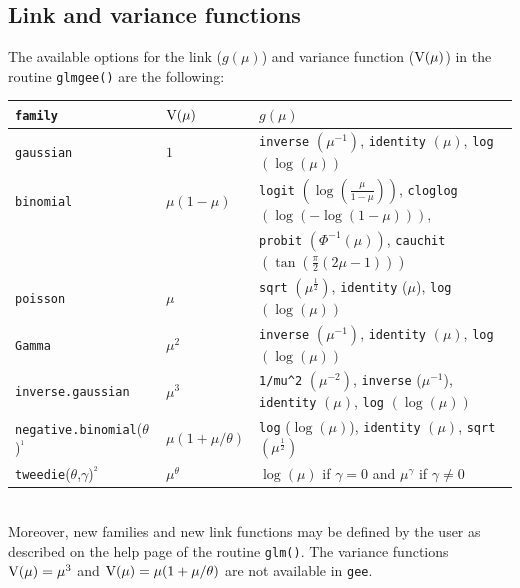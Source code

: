 \subsection{Link and variance functions}
The available options for the link ($g(\mu)$) and variance function (${\rm V}(\mu)$) in the routine {\tt glmgee()} are the following:
\begin{center}\label{vfs}
\begin{tabular}{l l l} 
 \hline
 {\tt family} & ${\rm V}(\mu)$ & $g(\mu)$\\ [1.5ex] 
 \hline
 {\tt gaussian} & $1$ & {\tt inverse} $\left(\mu^{-1}\right)$, {\tt identity} $(\mu)$, {\tt log} $(\log(\mu))$\\ 
 {\tt binomial} & $\mu(1-\mu)$ & {\tt logit} $\left(\!\log\!\left(\!\frac{\mu}{1-\mu}\!\right)\!\right)$, {\tt cloglog} $\left(\log(-\log(1-\mu))\right)$,\\
 &  & {\tt probit} $\left(\Phi^{-1}(\mu)\right)$, {\tt cauchit} $\left(\tan\!\left(\frac{\pi}{2}(2\mu-1)\right)\right)$\\
 {\tt poisson} & $\mu$ & {\tt sqrt} $\left(\!\mu^{\frac{1}{2}}\!\right)$, {\tt identity} ($\mu$), {\tt log} $(\log(\mu))$\\
 {\tt Gamma} & $\mu^2$ & {\tt inverse} $\left(\mu^{-1}\right)$, {\tt identity} $(\mu)$, {\tt log} $(\log(\mu))$\\
 {\tt inverse.gaussian} & $\mu^3$ & {\tt 1/mu\^{}2} $\left(\mu^{-2}\right)$, {\tt inverse} ($\mu^{-1}$), {\tt identity} $(\mu)$, {\tt log} $(\log(\mu))$\\
 {\tt negative.binomial}($\theta$)$^{^1}$ & $\mu(1+\mu/\theta)$ & {\tt log} ($\log(\mu)$), {\tt identity} $(\mu)$, {\tt sqrt} $\left(\!\mu^{\frac{1}{2}}\!\right)$ \\ 
 {\tt tweedie}($\theta$,$\gamma$)$^{^2}$ & $\mu^{\theta}$ & $\log(\mu)$ if $\gamma=0$ and $\mu^{\gamma}$ if $\gamma\neq 0$\\  
 [1ex] 
 \hline
\end{tabular}
\end{center}
\\

Moreover, new families and new link functions may be defined by the user as described on the help page of the routine {\tt glm()}. The variance 
functions ${\rm V}(\mu) = \mu^3$ and ${\rm V}(\mu) = \mu(1+\mu/\theta)$ are not available in {\tt gee}.

